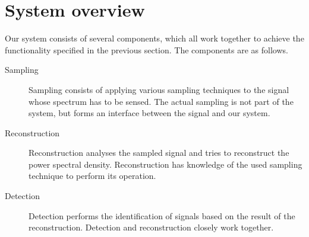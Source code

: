 \documentclass[a4paper, openany, oneside]{memoir}
\begin{document}











\section{System overview}
\label{sec:theory-system-overview}
Our system consists of several components, which all work together to achieve the functionality specified in the previous section. The components are as follows.

\begin{description}
    \item[Sampling] Sampling consists of applying various sampling techniques to the signal whose spectrum has to be sensed. The actual sampling is not part of the system, but forms an interface between the signal and our system.
    \item[Reconstruction] Reconstruction analyses the sampled signal and tries to reconstruct the power spectral density. Reconstruction has knowledge of the used sampling technique to perform its operation.
    \item[Detection] Detection performs the identification of signals based on the result of the reconstruction. Detection and reconstruction closely work together.
\end{description}
\end{document}
